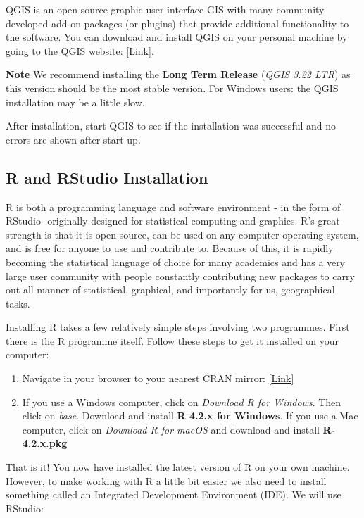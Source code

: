 \documentclass[
]{book}
\providecommand{\tightlist}{%
  \setlength{\itemsep}{0pt}\setlength{\parskip}{0pt}}
\begin{document}
QGIS is an open-source graphic user interface GIS with many community developed add-on packages (or plugins) that provide additional functionality to the software. You can download and install QGIS on your personal machine by going to the QGIS website: \href{https://qgis.org/en/site/forusers/download.html}{{[}Link{]}}.

\textbf{Note}
We recommend installing the \textbf{Long Term Release} (\emph{QGIS 3.22 LTR}) as this version should be the most stable version. For Windows users: the QGIS installation may be a little slow.

After installation, start QGIS to see if the installation was successful and no errors are shown after start up.

\hypertarget{r-and-rstudio-installation}{%
\subsection{R and RStudio Installation}\label{r-and-rstudio-installation}}

R is both a programming language and software environment - in the form of RStudio- originally designed for statistical computing and graphics. R's great strength is that it is open-source, can be used on any computer operating system, and is free for anyone to use and contribute to. Because of this, it is rapidly becoming the statistical language of choice for many academics and has a very large user community with people constantly contributing new packages to carry out all manner of statistical, graphical, and importantly for us, geographical tasks.

Installing R takes a few relatively simple steps involving two programmes. First there is the R programme itself. Follow these steps to get it installed on your computer:

\begin{enumerate}
\def\labelenumi{\arabic{enumi}.}
\tightlist
\item
  Navigate in your browser to your nearest CRAN mirror: \href{https://cran.ma.imperial.ac.uk/}{{[}Link{]}}
\item
  If you use a Windows computer, click on \emph{Download R for Windows}. Then click on \emph{base}. Download and install \textbf{R 4.2.x for Windows}. If you use a Mac computer, click on \emph{Download R for macOS} and download and install \textbf{R-4.2.x.pkg}
\end{enumerate}

That is it! You now have installed the latest version of R on your own machine. However, to make working with R a little bit easier we also need to install something called an Integrated Development Environment (IDE). We will use RStudio:
\end{document}
